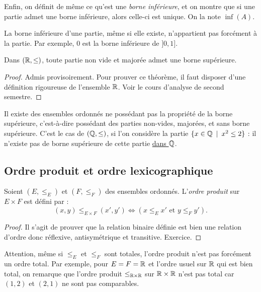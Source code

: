 Enfin, on définit de même ce qu'est une \emph{borne inférieure}, et on montre que si une partie admet une borne inférieure, alors celle-ci est unique. On la note $\inf(A)$. 

La borne inférieure d'une partie, même si elle existe, n'appartient pas forcément à la partie. Par exemple, $0$ est la borne inférieure de $]0,1]$.

\begin{theoreme}
Dans $(\mathbb{R},\leq)$, toute partie non vide et majorée admet une borne supérieure.
\end{theoreme}
\begin{proof}
Admis provisoirement. Pour prouver ce théorème, il faut disposer d'une définition rigoureuse de l'ensemble $\mathbb{R}$. Voir le cours d'analyse de second semestre.
\end{proof}

Il existe des ensembles ordonnés ne possédant pas la propriété de la borne supérieure, c'est-à-dire possédant des parties non-vides, majorées, et sans borne supérieure. C'est le cas de $(\mathbb{Q},\leq)$, si l'on considère la partie $\{x\in \Q\:\mid\: x^2\leq 2\}$ : il n'existe pas de borne supérieure de cette partie \underline{dans $\mathbb{Q}$}.


\subsection{Ordre produit et ordre lexicographique}

\begin{propdef}
Soient $(E,\leq_E)$ et $(F,\leq_F)$ des ensembles ordonnés.
L'\emph{ordre produit} sur $E\times F$ est défini par :
\[
(x,y) \leq_{E\times F} (x',y') \iff \left(x\leq_E x' \text{ et } y\leq_F y'\right).
\]
\end{propdef}
\begin{proof}
Il s'agit de prouver que la relation binaire définie est bien une relation d'ordre donc réflexive, antisymétrique et transitive. Exercice.
\end{proof}

Attention, même si $\leq_E$ et $\leq_F$ sont totales, l'ordre produit n'est pas forcément un ordre total. Par exemple, pour $E=F=\mathbb{R}$ et l'ordre usuel sur $\mathbb{R}$ qui est bien total, on remarque que l'ordre produit $\leq_{\mathbb{R}\times\mathbb{R}}$ sur $\mathbb{R}\times \mathbb{R}$ n'est pas total car $(1,2)$ et $(2,1)$ ne sont pas comparables.

